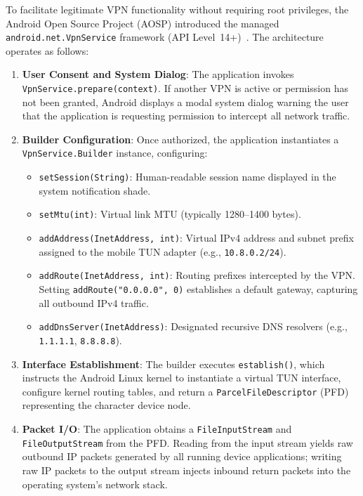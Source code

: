 To facilitate legitimate VPN functionality without requiring root privileges, the Android Open Source Project (AOSP) introduced the managed \texttt{android.net.VpnService} framework (API Level~14+)~\cite{android_vpnservice_docs}. The architecture operates as follows:
\begin{enumerate}
    \item \textbf{User Consent and System Dialog}: The application invokes \texttt{VpnService.prepare(context)}. If another VPN is active or permission has not been granted, Android displays a modal system dialog warning the user that the application is requesting permission to intercept all network traffic.
    \item \textbf{Builder Configuration}: Once authorized, the application instantiates a \texttt{VpnService.Builder} instance, configuring:
    \begin{itemize}
        \item \texttt{setSession(String)}: Human-readable session name displayed in the system notification shade.
        \item \texttt{setMtu(int)}: Virtual link MTU (typically 1280--1400 bytes).
        \item \texttt{addAddress(InetAddress, int)}: Virtual IPv4 address and subnet prefix assigned to the mobile TUN adapter (e.g., \texttt{10.8.0.2/24}).
        \item \texttt{addRoute(InetAddress, int)}: Routing prefixes intercepted by the VPN. Setting \texttt{addRoute("0.0.0.0", 0)} establishes a default gateway, capturing all outbound IPv4 traffic.
        \item \texttt{addDnsServer(InetAddress)}: Designated recursive DNS resolvers (e.g., \texttt{1.1.1.1}, \texttt{8.8.8.8}).
    \end{itemize}
    \item \textbf{Interface Establishment}: The builder executes \texttt{establish()}, which instructs the Android Linux kernel to instantiate a virtual TUN interface, configure kernel routing tables, and return a \texttt{ParcelFileDescriptor} (PFD) representing the character device node.
    \item \textbf{Packet I/O}: The application obtains a \texttt{FileInputStream} and \texttt{FileOutputStream} from the PFD. Reading from the input stream yields raw outbound IP packets generated by all running device applications; writing raw IP packets to the output stream injects inbound return packets into the operating system's network stack.
\end{enumerate}

